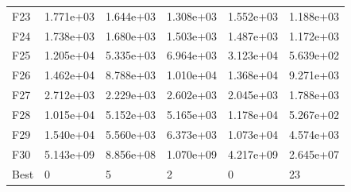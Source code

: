 \begin{tabular}{llllll}
F23  &  1.771e+03 &  1.644e+03 &  1.308e+03 &  1.552e+03 &  1.188e+03 \\
F24  &  1.738e+03 &  1.680e+03 &  1.503e+03 &  1.487e+03 &  1.172e+03 \\
F25  &  1.205e+04 &  5.335e+03 &  6.964e+03 &  3.123e+04 &  5.639e+02 \\
F26  &  1.462e+04 &  8.788e+03 &  1.010e+04 &  1.368e+04 &  9.271e+03 \\
F27  &  2.712e+03 &  2.229e+03 &  2.602e+03 &  2.045e+03 &  1.788e+03 \\
F28  &  1.015e+04 &  5.152e+03 &  5.165e+03 &  1.178e+04 &  5.267e+02 \\
F29  &  1.540e+04 &  5.560e+03 &  6.373e+03 &  1.073e+04 &  4.574e+03 \\
F30  &  5.143e+09 &  8.856e+08 &  1.070e+09 &  4.217e+09 &  2.645e+07 \\
Best &          0 &          5 &          2 &          0 &         23 \\
\bottomrule
\end{tabular}
